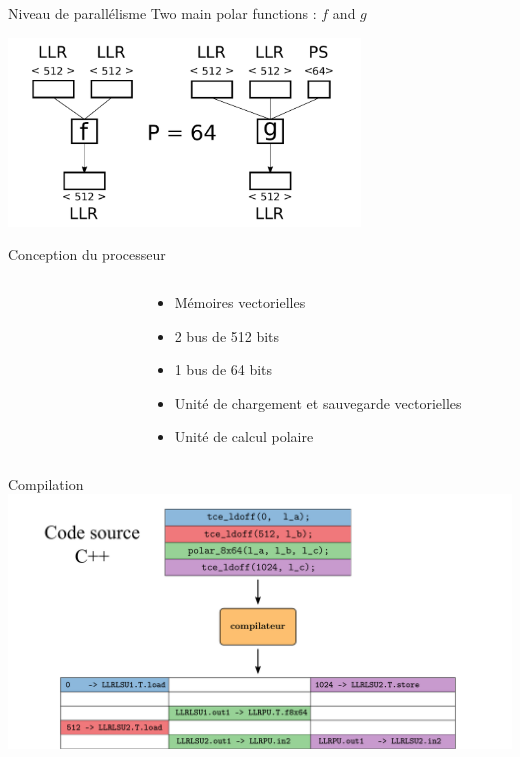 \documentclass[t,compress,mathserif,12pt,xcolor=dvipsnames]{beamer}
\begin{document}
\begin{frame}[c]{Niveau de parallélisme}
	Two main polar functions : $f$ and $g$
	\vspace{1cm}

	\includegraphics[width=0.7\textwidth]{fig/f_g_dimensions_vector}
\end{frame}

\begin{frame}[c]{Conception du processeur}
	\begin{columns}[T] %
		\begin{column}{.48\textwidth}
			\vspace{-0.5cm}
		\end{column}
		\begin{column}{.07\textwidth}
		\end{column}
		\begin{column}{.41\textwidth}
			\begin{itemize}
				\item<1-> Mémoires vectorielles
				\vspace{0.2cm}
				\item<2-> 2 bus de 512 bits
				\vspace{0.2cm}
				\item<2-> 1 bus de 64 bits
				\vspace{0.2cm}
				\item<3-> Unité de chargement et sauvegarde vectorielles
				\vspace{0.2cm}
				\item<4-> Unité de calcul polaire
			\end{itemize}
		\end{column}
	\end{columns} %
\end{frame}

\begin{frame}[c]{Compilation}
	\includegraphics[width=\textwidth]{fig/compilation}
\end{frame}
\end{document}
